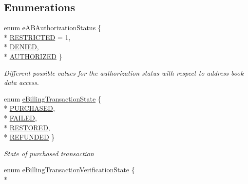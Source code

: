 \subsection*{Enumerations}
\begin{DoxyCompactItemize}
\item 
enum \hyperlink{namespace_voxel_busters_1_1_native_plugins_a52e7845cde15260bea7e2d269fd8711c}{e\+A\+B\+Authorization\+Status} \{ \\*
\hyperlink{namespace_voxel_busters_1_1_native_plugins_a52e7845cde15260bea7e2d269fd8711ca0c6311db6cc263ccd2de0ea3467577ae}{R\+E\+S\+T\+R\+I\+C\+T\+E\+D} = 1, 
\\*
\hyperlink{namespace_voxel_busters_1_1_native_plugins_a52e7845cde15260bea7e2d269fd8711ca66d5e0b0ce726b4aeb4ddf6c25b6c12b}{D\+E\+N\+I\+E\+D}, 
\\*
\hyperlink{namespace_voxel_busters_1_1_native_plugins_a52e7845cde15260bea7e2d269fd8711cac62575d93ceab8ef551cb3fe0a3aea63}{A\+U\+T\+H\+O\+R\+I\+Z\+E\+D}
 \}
\begin{DoxyCompactList}\small\item\em Different possible values for the authorization status with respect to address book data access. \end{DoxyCompactList}\item 
enum \hyperlink{namespace_voxel_busters_1_1_native_plugins_a1b545f54cd8f7e04410c379e01ff27f2}{e\+Billing\+Transaction\+State} \{ \\*
\hyperlink{namespace_voxel_busters_1_1_native_plugins_a1b545f54cd8f7e04410c379e01ff27f2a9a7e8795cdb010b8a0ecb10c1f5fe153}{P\+U\+R\+C\+H\+A\+S\+E\+D}, 
\\*
\hyperlink{namespace_voxel_busters_1_1_native_plugins_a1b545f54cd8f7e04410c379e01ff27f2ab9e14d9b2886bcff408b85aefa780419}{F\+A\+I\+L\+E\+D}, 
\\*
\hyperlink{namespace_voxel_busters_1_1_native_plugins_a1b545f54cd8f7e04410c379e01ff27f2ab8c05d010b112c77a9f87ecf15eb151b}{R\+E\+S\+T\+O\+R\+E\+D}, 
\\*
\hyperlink{namespace_voxel_busters_1_1_native_plugins_a1b545f54cd8f7e04410c379e01ff27f2a72498e65a0803a35d8379566cd08b5ff}{R\+E\+F\+U\+N\+D\+E\+D}
 \}
\begin{DoxyCompactList}\small\item\em State of purchased transaction \end{DoxyCompactList}\item 
enum \hyperlink{namespace_voxel_busters_1_1_native_plugins_adebe7e13622c835cd0cd075be41b2003}{e\+Billing\+Transaction\+Verification\+State} \{ \\*

\end{DoxyCompactItemize}
